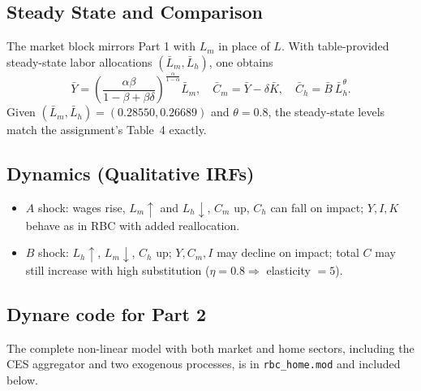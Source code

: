 \documentclass[a4paper,12pt]{article} %
\theoremstyle{nonitalic}
\begin{document}
\subsection{Steady State and Comparison}
The market block mirrors Part 1 with $L_m$ in place of $L$. With table-provided steady-state labor allocations $(\bar L_m,\bar L_h)$,
one obtains
\begin{equation}
\bar Y=\left(\frac{\alpha\beta}{1-\beta+\beta\delta}\right)^{\frac{\alpha}{1-\alpha}} \bar L_m,\quad
\bar C_m=\bar Y-\delta \bar K,\quad
\bar C_h=\bar B\ \bar L_h^{\theta}.
\end{equation}
Given $(\bar L_m,\bar L_h)=(0.28550,0.26689)$ and $\theta=0.8$, the steady-state levels match the assignment's Table~4 exactly.

\subsection{Dynamics (Qualitative IRFs)}
\begin{itemize}[nosep]
  \item $A$ shock: wages rise, $L_m\uparrow$ and $L_h\downarrow$, $C_m$ up, $C_h$ can fall on impact; $Y,I,K$ behave as in RBC with added reallocation.
  \item $B$ shock: $L_h\uparrow$, $L_m\downarrow$, $C_h$ up; $Y,C_m,I$ may decline on impact; total $C$ may still increase with high substitution ($\eta=0.8\Rightarrow$ elasticity $=5$).
\end{itemize}

\subsection{Dynare code for Part 2}
The complete non-linear model with both market and home sectors, including the CES aggregator and two exogenous processes,
is in \texttt{rbc\_home.mod} and included below.

\begin{lstlisting}[language=Dynare,caption={\texttt{rbc\_home.mod}},label={lst:rbc_home}]

\end{lstlisting}
\end{document}
